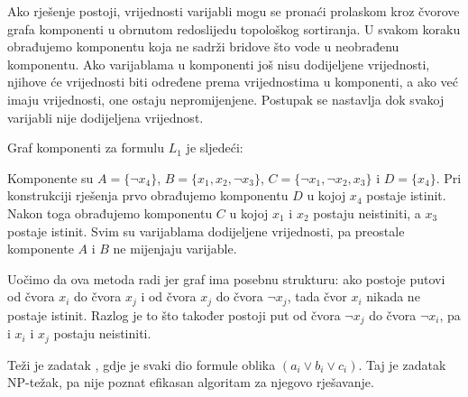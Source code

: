 Ako rješenje postoji, vrijednosti varijabli
mogu se pronaći prolaskom kroz čvorove
grafa komponenti u obrnutom redoslijedu topološkog sortiranja.
U svakom koraku obrađujemo komponentu 
koja ne sadrži bridove što vode u
neobrađenu komponentu.
Ako varijablama u komponenti
još nisu dodijeljene vrijednosti,
njihove će vrijednosti biti određene
prema vrijednostima u komponenti,
a ako već imaju vrijednosti,
one ostaju nepromijenjene.
Postupak se nastavlja dok svakoj varijabli
nije dodijeljena vrijednost.

Graf komponenti za formulu $L_1$ je sljedeći:
\begin{center}
\end{center}

Komponente su
$A = \{\lnot x_4\}$,
$B = \{x_1, x_2, \lnot x_3\}$,
$C = \{\lnot x_1, \lnot x_2, x_3\}$ i
$D = \{x_4\}$.
Pri konstrukciji rješenja
prvo obrađujemo komponentu $D$
u kojoj $x_4$ postaje istinit.
Nakon toga obrađujemo komponentu $C$
u kojoj $x_1$ i $x_2$ postaju neistiniti,
a $x_3$ postaje istinit.
Svim su varijablama dodijeljene vrijednosti,
pa preostale komponente $A$ i $B$
ne mijenjaju varijable.

Uočimo da ova metoda radi jer
graf ima posebnu strukturu:
ako postoje putovi od čvora $x_i$ do čvora $x_j$
i od čvora $x_j$ do čvora $\lnot x_j$,
tada čvor $x_i$ nikada ne postaje istinit.
Razlog je to što također postoji
put od čvora $\lnot x_j$ do čvora $\lnot x_i$,
pa i $x_i$ i $x_j$ postaju neistiniti.


Teži je zadatak ,
gdje je svaki dio formule oblika
$(a_i \lor b_i \lor c_i)$.
Taj je zadatak NP-težak, pa nije poznat efikasan
algoritam za njegovo rješavanje.
